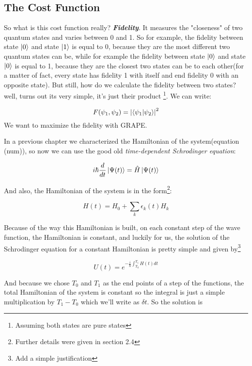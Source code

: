 \documentclass{article}
\numberwithin{equation}{section}
\begin{document}
\subsection{The Cost Function}
So what is this cost function really? \textit{\textbf{Fidelity}}. It measures the "closeness" of two quantum states and varies between 0 and 1. So for example, the fidelity between state $\ket{0}$ and state $\ket{1}$ is equal to 0, because they are the most different two quantum states can be, while for example the fidelity between state $\ket{0}$ and state $\ket{0}$ is equal to 1, because they are the closest two states can be to each other(for a matter of fact, every state has fidelity 1 with itself and end fidelity 0 with an opposite state). But still, how do we calculate the fidelity between two states? well, turns out its very simple, it's just their product \footnote{Assuming both states are pure states}. We can write:

\begin{equation}
F(\psi_1, \psi_2) = \abs{\braket{\psi_1}{\psi_2}}^2
\end{equation}
We want to maximize the fidelity with GRAPE.\par
In a previous chapter we characterized the Hamiltonian of the system(equation (num)), so now we can use the good old \textit{time-dependent Schrodinger equation}:

\begin{equation}
i\hbar\frac{d}{dt}\ket{\Psi(t)} = \hat{H}\ket{\Psi(t)}
\end{equation}

And also, the Hamiltonian of the system is in the form\footnote{Further details were given in section 2.4}:

\begin{equation}
H(t) = H_0 + \sum_k{\epsilon_k(t) H_k} %
\end{equation}

Because of the way this Hamiltonian is built, on each constant step of the wave function, the Hamiltonian is constant, and luckily for us, the solution of the Schrodinger equation for a constant Hamiltonian is pretty simple and given by\footnote{Add a simple justification}

\begin{equation}
U(t) = e^{-\frac{i}{\hbar}\int_{T_0}^{T_1}H(t)dt}
\end{equation}

And because we chose $T_0$ and $T_1$ as the end points of a step of the functions, the total Hamiltonian of the system is constant so the integral is just a simple multiplication by $T_1-T_0$ which we'll write as $\delta t$. So the solution is
\end{document}
